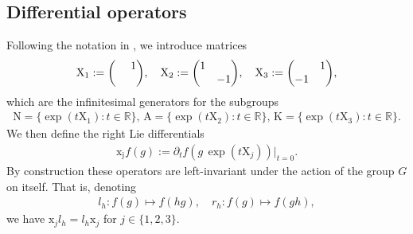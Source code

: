 \documentclass[12pt]{amsart}
\theoremstyle{definition}
\theoremstyle{remark}
\numberwithin{equation}{section}
\newcommand{\R}{{\mathbb R}}
\newcommand{\1}{{\mathbf 1}}
\renewcommand{\exp}{\operatorname{exp}}
\begin{document}
\subsection{Differential operators}
Following the notation in \cite{motohashielements},
we introduce matrices
\begin{align*}
    \mathrm{X}_1 := \mqty(\,\,&1 \\ \,\, &),  \quad \mathrm{X}_2 := \mqty(1& \\ &-1), \quad  \mathrm{X}_3 := \mqty( & 1 \\ -1 & ),
\end{align*}
which are the infinitesimal generators for the subgroups
\begin{align*}
    \mathrm{N} = \{\exp( t \mathrm{X}_1): t \in \R\}, \,    \mathrm{A} = \{\exp( t \mathrm{X}_2): t \in \R\}, \, \mathrm{K} = \{\exp( t \mathrm{X}_3): t \in \R\}.
\end{align*}
We then define the right Lie differentials
\begin{align*}
    \mathrm{x_j}f(g) := \partial_t f(g \,\exp(t \mathrm{X}_j)) |_{t=0}.
\end{align*}
By construction these operators are left-invariant under the action of the group $G$ on itself. That is, denoting
\begin{align*}
    l_h: f(g) \mapsto f(hg), \quad r_h: f(g) \mapsto f(gh),
\end{align*}
we have $\mathrm{x}_j l_h=l_h\mathrm{x}_j$ for $j\in\{1,2,3\}$.
\end{document}
